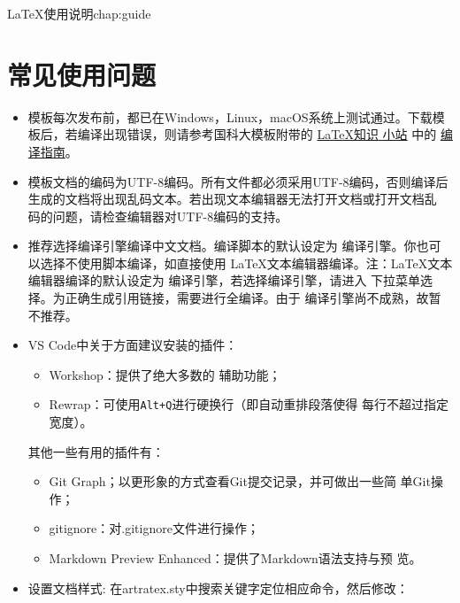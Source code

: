 \begin{cuzchapter}{\LaTeX{}使用说明}{chap:guide}

	\section{常见使用问题}\label{sec:qa}

	\begin{itemize}
		\item 模板每次发布前，都已在Windows，Linux，macOS系统上测试通过。下载模
		      板后，若编译出现错误，则请参考国科大模板附带的
		      \href{https://github.com/mohuangrui/ucasthesis/wiki}{\LaTeX{}知识
			      小站} 中的
		      \href{https://github.com/mohuangrui/ucasthesis/wiki/%E7%BC%96%E8%AF%91%E6%8C%87%E5%8D%97}{编
			      译指南}。
		\item 模板文档的编码为UTF-8编码。所有文件都必须采用UTF-8编码，否则编译后
		      生成的文档将出现乱码文本。若出现文本编辑器无法打开文档或打开文档乱
		      码的问题，请检查编辑器对UTF-8编码的支持。
		\item 推荐选择编译引擎编译中文文档。编译脚本的默认设定为
		      编译引擎。你也可以选择不使用脚本编译，如直接使用
		      \LaTeX{}文本编辑器编译。注：\LaTeX{}文本编辑器编译的默认设定为
		      编译引擎，若选择编译引擎，请进入
		      下拉菜单选择。为正确生成引用链接，需要进行全编译。由于
		      编译引擎尚不成熟，故暂不推荐。
		\item VS Code中关于方面建议安装的插件：
		      \begin{itemize}
			      \item {} Workshop：提供了绝大多数的
			            辅助功能；
			      \item Rewrap：可使用\verb|Alt+Q|进行硬换行（即自动重排段落使得
			            每行不超过指定宽度）。
		      \end{itemize}
		      其他一些有用的插件有：
		      \begin{itemize}
			      \item Git Graph；以更形象的方式查看Git提交记录，并可做出一些简
			            单Git操作；
			      \item gitignore：对.gitignore文件进行操作；
			      \item Markdown Preview Enhanced：提供了Markdown语法支持与预
			            览。
		      \end{itemize}
		\item 设置文档样式: 在artratex.sty中搜索关键字定位相应命令，然后修改：
		      \begin{itemize}

\end{itemize}
\end{itemize}
\end{cuzchapter}

